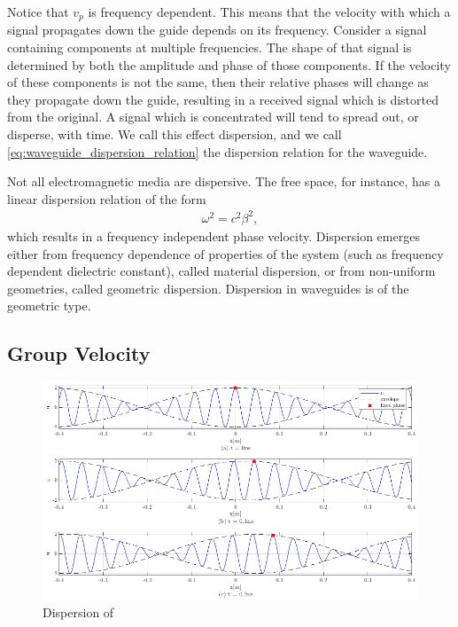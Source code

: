 \documentclass{article}
\begin{document}
Notice that \(v_p\) is frequency dependent. This means that the velocity with which a signal propagates down the guide depends on its frequency. Consider a signal containing components at multiple frequencies. The shape of that signal is determined by both the amplitude and phase of those components. If the velocity of these components is not the same, then their relative phases will change as they propagate down the guide, resulting in a received signal which is distorted from the original. A signal which is concentrated will tend to spread out, or disperse, with time. We call this effect dispersion, and we call \eqref{eq:waveguide_dispersion_relation} the dispersion relation for the waveguide.

Not all electromagnetic media are dispersive. The free space, for instance, has a linear dispersion relation of the form \begin{align*}
    \omega^2 = c^2\beta^2, 
\end{align*} which results in a frequency independent phase velocity. Dispersion emerges either from frequency dependence of properties of the system (such as frequency dependent dielectric constant), called material dispersion, or from non-uniform geometries, called geometric dispersion. Dispersion in waveguides is of the geometric type.

\subsection{Group Velocity}

\begin{figure}[h!]
    \centering
    \includegraphics[width=1\textwidth]{figures/dispersion_demo.png}
    \caption{Dispersion of}
    \label{fig:dispersion_demo}
\end{figure}
\end{document}
